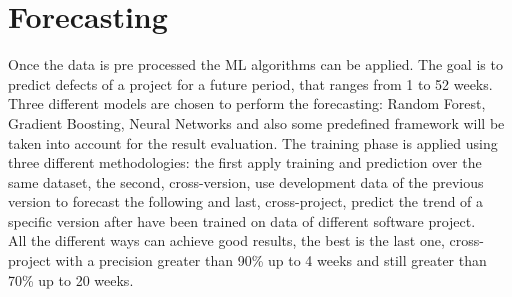 \documentclass{article}
\begin{document}
\section{Forecasting}
Once the data is pre processed the ML algorithms can be applied. The goal is to predict defects of a project for a future period, that ranges from 1 to 52 weeks.
Three different models are chosen to perform the forecasting: Random Forest, Gradient Boosting, Neural Networks and also some predefined framework will be taken into account for the result evaluation.
The training phase is applied using three different methodologies: the first apply training and prediction over the same dataset, the second, cross-version, use development data of the previous version to forecast the following and last, cross-project, predict the trend of a specific version after have been trained on data of different software project.\\
All the different ways can achieve good results, the best is the last one, cross-project with a precision greater than 90\% up to 4 weeks and still greater than 70\% up to 20 weeks. 
\end{document}
